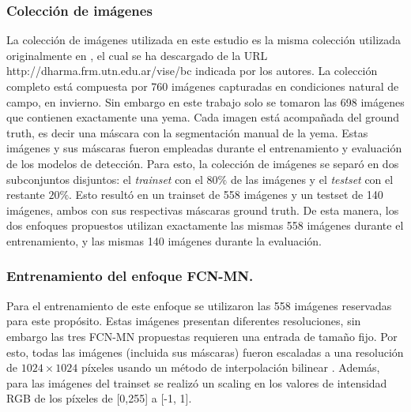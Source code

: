 \documentclass[a4paper,authoryear,review]{elsarticle}
\begin{document}
	\subsubsection{Colección de imágenes}
	\label{sec:collection}
	
	La colección de imágenes utilizada en este estudio es la misma colección utilizada originalmente en \citet{perez2017image}, el cual se ha descargado de la URL http://dharma.frm.utn.edu.ar/vise/bc indicada por los autores. La colección completo está compuesta por 760 imágenes capturadas en condiciones natural de campo, en invierno. Sin embargo en este trabajo solo se tomaron las 698 imágenes que contienen exactamente una yema. Cada imagen está acompañada del ground truth, es decir una máscara con la segmentación manual de la yema. Estas imágenes y sus máscaras fueron empleadas durante el entrenamiento y evaluación de los modelos de detección. Para esto, la colección de imágenes se separó en dos subconjuntos disjuntos: el \emph{trainset} con el $80\%$ de las imágenes y el \emph{testset} con el restante $20\%$. Esto resultó en un trainset de 558 imágenes y un testset de 140 imágenes, ambos con sus respectivas máscaras ground truth. De esta manera, los dos enfoques propuestos utilizan exactamente las mismas 558 imágenes durante el entrenamiento, y las mismas 140 imágenes durante la evaluación.
	
	
	\subsubsection{Entrenamiento del enfoque FCN-MN.} 
	\label{sec:fcntrain}
	
	Para el entrenamiento de este enfoque se utilizaron las 558 imágenes reservadas para este propósito. Estas imágenes presentan diferentes resoluciones, sin embargo las tres FCN-MN propuestas requieren una entrada de tamaño fijo. Por esto, todas las imágenes (incluida sus máscaras) fueron escaladas a una resolución de $1024 \times 1024$ píxeles usando un método de interpolación bilinear \citep{han2013comparison}. Además, para las imágenes del trainset se realizó un scaling en los valores de intensidad RGB de los píxeles de [0,255] a [-1, 1].
	
\end{document}
